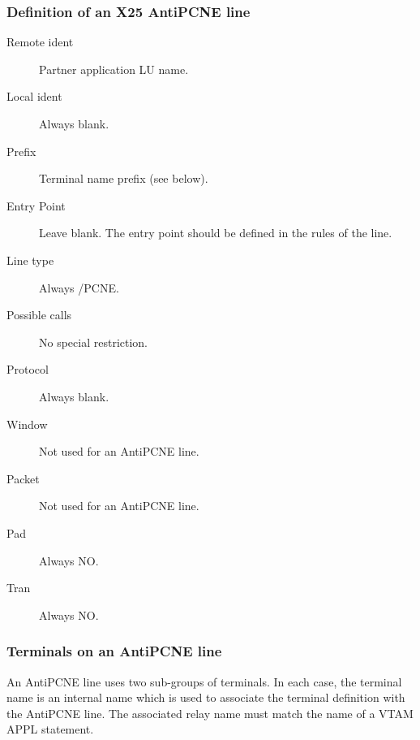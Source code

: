 \documentclass[letterpaper,10pt,english]{sphinxmanual}
\begin{document}


\subsubsection{Definition of an X25 AntiPCNE line}
\label{\detokenize{connectivity_guide:definition-of-an-x25-antipcne-line}}\begin{description}
\item[{Remote ident}] \leavevmode
Partner application LU name.

\item[{Local ident}] \leavevmode
Always blank.

\item[{Prefix}] \leavevmode
Terminal name prefix (see below).

\item[{Entry Point}] \leavevmode
Leave blank. The entry point should be defined in the rules of the line.

\item[{Line type}] \leavevmode
Always /PCNE.

\item[{Possible calls}] \leavevmode
No special restriction.

\item[{Protocol}] \leavevmode
Always blank.

\item[{Window}] \leavevmode
Not used for an AntiPCNE line.

\item[{Packet}] \leavevmode
Not used for an AntiPCNE line.

\item[{Pad}] \leavevmode
Always NO.

\item[{Tran}] \leavevmode
Always NO.

\end{description}


\subsubsection{Terminals on an AntiPCNE line}
\label{\detokenize{connectivity_guide:terminals-on-an-antipcne-line}}
An AntiPCNE line uses two sub-groups of terminals. In each case, the terminal name is an internal name which is used to associate the terminal definition with the AntiPCNE line. The associated relay name must match the name of a VTAM APPL statement.
\end{document}

